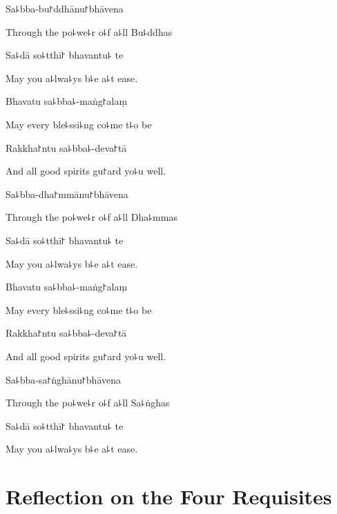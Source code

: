 Sa꜕bba-bu꜓ddhānu꜓bhāvena

\begin{english}
  Through the po꜕we꜕r o꜕f a꜕ll Bu꜕ddhas
\end{english}

Sa꜕dā so꜕tthī꜓ bhavantu꜕ te

\begin{english}
  May you a꜕lwa꜕ys b꜕e a꜕t ease.
\end{english}

Bhavatu sa꜕bba꜕-maṅg꜓alaṃ

\begin{english}
  May every ble꜕ssi꜕ng co꜕me t꜕o be
\end{english}

Rakkha꜓ntu sa꜕bba꜕-deva꜓tā

\begin{english}
  And all good spirits gu꜓ard yo꜕u well.
\end{english}

Sa꜕bba-dha꜓mmānu꜓bhāvena

\begin{english}
  Through the po꜕we꜕r o꜕f a꜕ll Dha꜕mmas
\end{english}

Sa꜕dā so꜕tthī꜓ bhavantu꜕ te

\begin{english}
  May you a꜕lwa꜕ys b꜕e a꜕t ease.
\end{english}

Bhavatu sa꜕bba꜕-maṅg꜓alaṃ

\begin{english}
  May every ble꜕ssi꜕ng co꜕me t꜕o be
\end{english}

Rakkha꜓ntu sa꜕bba꜕-deva꜓tā

\begin{english}
  And all good spirits gu꜓ard yo꜕u well.
\end{english}

Sa꜕bba-sa꜓ṅghānu꜓bhāvena

\begin{english}
  Through the po꜕we꜕r o꜕f a꜕ll Sa꜕ṅghas
\end{english}

Sa꜕dā so꜕tthī꜓ bhavantu꜕ te

\begin{english}
  May you a꜕lwa꜕ys b꜕e a꜕t ease.
\end{english}

\chapter[Four Requisites]{Reflection on the Four Requisites}%

